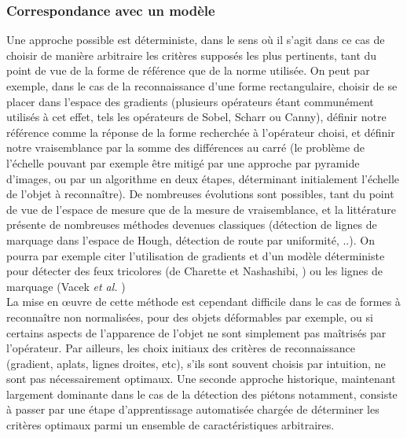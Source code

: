 \subsubsection{Correspondance avec un modèle}
Une approche possible est déterministe, dans le sens où il s'agit dans ce cas de choisir de manière arbitraire les critères supposés les plus pertinents, tant du point de vue de la forme de référence que de la norme utilisée. On peut par exemple, dans le cas de la reconnaissance d'une forme rectangulaire, choisir de se placer dans l'espace des gradients (plusieurs opérateurs étant communément utilisés à cet effet, tels les opérateurs de Sobel, Scharr ou Canny), définir notre référence comme la réponse de la forme recherchée à l'opérateur choisi, et définir notre vraisemblance par la somme des différences au carré (le problème de l'échelle pouvant par exemple être mitigé par une approche par pyramide d'images, ou par un algorithme en deux étapes, déterminant initialement l'échelle de l'objet à reconnaître). De nombreuses évolutions sont possibles, tant du point de vue de l'espace de mesure que de la mesure de vraisemblance, et la littérature présente de nombreuses méthodes devenues classiques (détection de lignes de marquage dans l'espace de Hough, détection de route par uniformité, ..). On pourra par exemple citer l'utilisation de gradients et d'un modèle déterministe pour détecter des feux tricolores (de Charette et Nashashibi, \cite{Charette2009}) ou les lignes de marquage (Vacek \textit{et al.} \cite{Vacek2006})\\

La mise en œuvre de cette méthode est cependant difficile dans le cas de formes à reconnaître non normalisées, pour des objets déformables par exemple, ou si certains aspects de l'apparence de l'objet ne sont simplement pas maîtrisés par l'opérateur. Par ailleurs, les choix initiaux des critères de reconnaissance (gradient, aplats, lignes droites, etc), s'ils sont souvent choisis par intuition, ne sont pas nécessairement optimaux. Une seconde approche historique, maintenant largement dominante dans le cas de la détection des piétons notamment, consiste à passer par une étape d'apprentissage automatisée chargée de déterminer les critères optimaux parmi un ensemble de caractéristiques arbitraires.

